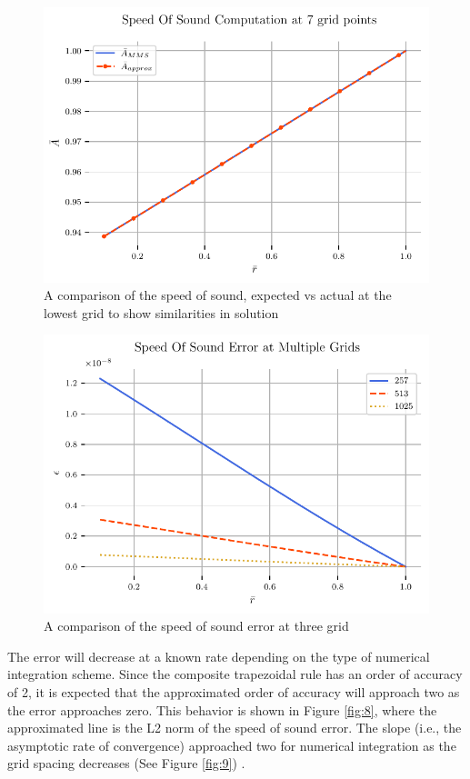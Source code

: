 \begin{figure}[h!]
    \centering
    \includegraphics{../../../CodeRun/04-plotReport/tex-outputs/MMS1_SpeedOfSoundComparison1.pdf}
    \caption{ A comparison of the speed of sound, expected vs actual at the lowest grid to show similarities in solution}
    \label{fig:5}
\end{figure}


\begin{figure}[h!]
    \centering
    \includegraphics{../../../CodeRun/04-plotReport/tex-outputs/MMS1_SpeedOfSoundComparison2.pdf}
    \caption{ A comparison of the speed of sound error at three grid}
    \label{fig:5a}
\end{figure}

The error will decrease at a known rate depending on the type of numerical integration scheme. Since the composite trapezoidal rule has an order of accuracy
of 2, it is expected that the approximated order of accuracy will approach two as the
error approaches zero. This behavior is shown in Figure \ref{fig:8}, where the approximated
line is the L2 norm of the speed of sound error. The slope (i.e., the asymptotic rate of
convergence) approached two for numerical integration as the grid spacing decreases
(See Figure \ref{fig:9}) .

